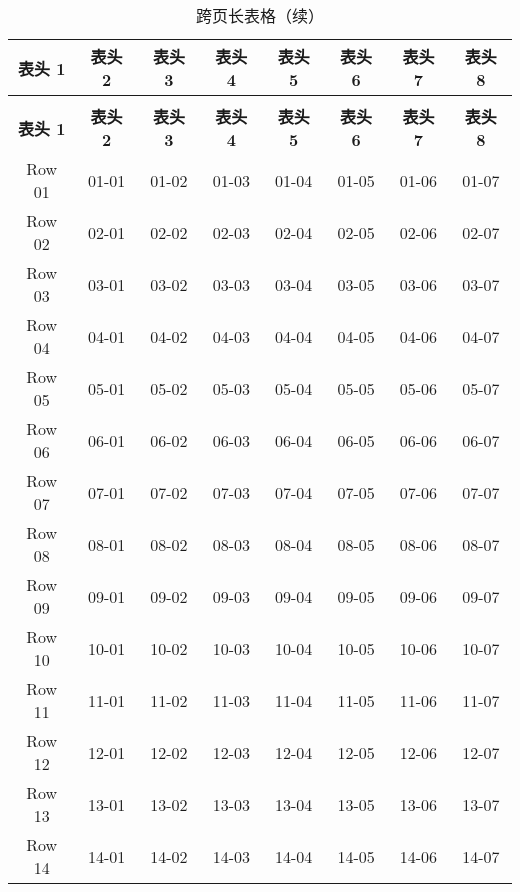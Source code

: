 \documentclass[report,oneside,UTF8,zihao=-4]{config}
\begin{document}
\begin{longtable}{cccccccc}
    \caption{跨页长表格} \\ %
    \toprule[1.5pt]
        \textbf{表头 1} & \textbf{表头 2} & \textbf{表头 3} & \textbf{表头 4} & \textbf{表头 5} & \textbf{表头 6} & \textbf{表头 7} & \textbf{表头 8} \\ %
    \midrule[0.8pt]
    \endfirsthead
    
    \caption[]{跨页长表格（续）} \\ %
    \toprule[1.5pt]
        \textbf{表头 1} & \textbf{表头 2} & \textbf{表头 3} & \textbf{表头 4} & \textbf{表头 5} & \textbf{表头 6} & \textbf{表头 7} & \textbf{表头 8} \\  %
    \midrule[0.8pt]
    \endhead
        \bottomrule[1.5pt]
    \endfoot 
    \bottomrule[1.5pt]
    \endlastfoot
    \label{tab:longTable}
        Row 01 & 01-01 & 01-02 & 01-03 & 01-04 & 01-05 & 01-06 & 01-07 \\
        Row 02 & 02-01 & 02-02 & 02-03 & 02-04 & 02-05 & 02-06 & 02-07 \\
        Row 03 & 03-01 & 03-02 & 03-03 & 03-04 & 03-05 & 03-06 & 03-07 \\
        Row 04 & 04-01 & 04-02 & 04-03 & 04-04 & 04-05 & 04-06 & 04-07 \\
        Row 05 & 05-01 & 05-02 & 05-03 & 05-04 & 05-05 & 05-06 & 05-07 \\
        Row 06 & 06-01 & 06-02 & 06-03 & 06-04 & 06-05 & 06-06 & 06-07 \\
        Row 07 & 07-01 & 07-02 & 07-03 & 07-04 & 07-05 & 07-06 & 07-07 \\
        Row 08 & 08-01 & 08-02 & 08-03 & 08-04 & 08-05 & 08-06 & 08-07 \\
        Row 09 & 09-01 & 09-02 & 09-03 & 09-04 & 09-05 & 09-06 & 09-07 \\
        Row 10 & 10-01 & 10-02 & 10-03 & 10-04 & 10-05 & 10-06 & 10-07 \\
        Row 11 & 11-01 & 11-02 & 11-03 & 11-04 & 11-05 & 11-06 & 11-07 \\
        Row 12 & 12-01 & 12-02 & 12-03 & 12-04 & 12-05 & 12-06 & 12-07 \\
        Row 13 & 13-01 & 13-02 & 13-03 & 13-04 & 13-05 & 13-06 & 13-07 \\
        Row 14 & 14-01 & 14-02 & 14-03 & 14-04 & 14-05 & 14-06 & 14-07 \\

\end{longtable}
\end{document}
